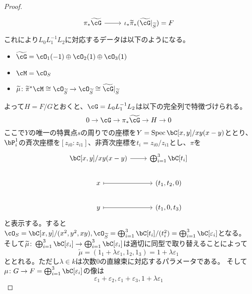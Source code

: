\documentclass[uplatex, a4paper, dvipdfmx]{jsarticle}
\theoremstyle{definition}
\DeclareMathOperator{\Spec}{\mathrm{Spec}}
\begin{document}
\begin{proof}
\begin{equation}
\begin{tikzcd}
            \pi_*\widetilde{\cG} \arrow[r] & \iota_*\widetilde{\pi}_*(\widetilde{\cG}\vert_{\widetilde{S}}) = F
        \end{tikzcd}
    \end{equation}
    これにより$L_0L_1^{-1}L_2$に対応するデータは以下のようになる。
    \begin{itemize}
        \item $\widetilde{\cG} = \cO_1(-1)\oplus\cO_2(1)\oplus\cO_3(1)$
        \item $\cM = \cO_S$
        \item $\widetilde{\mu} \colon \widetilde{\pi}^*\cM \cong \cO_{\widetilde{S}} \to \cO_{\widetilde{S}} \cong \widetilde{\cG}\vert_{\widetilde{S}}$
    \end{itemize}
    よって$H = F/G$とおくと、$\cG = L_0L_1^{-1}L_2$は以下の完全列で特徴づけられる。
    \begin{equation}
        0 \to \cG \to \pi_*\widetilde{\cG} \to H \to 0
    \end{equation}
    ここで$Y$の唯一の特異点$s$の周りでの座標を$Y = \Spec \bC[x, y]/xy(x-y)$ととり、$\bP^1_i$の斉次座標を$[z_{i0} : z_{i1}]$、非斉次座標を$t_i = z_{i0}/z_{i1}$とし、$\pi$を
    \begin{equation}
        \begin{tikzcd}
            \bC[x, y]/xy(x-y) \arrow[r]& \bigoplus_{i=1}^3 \bC[t_i] \\
            x \arrow[r, mapsto] & (t_1, t_2, 0) \\
            y \arrow[r, mapsto] & (t_1, 0, t_3)
        \end{tikzcd}
    \end{equation}
    と表示する。すると$\cO_S = \bC[x,y]/(x^2, y^2, xy), \cO_{\widetilde{S}} = \bigoplus_{i=1}^3 \bC[t_i]/(t_i^2) = \bigoplus_{i=1}^3 \bC[\varepsilon_i]$となる。
    そして$\widetilde{\mu} \colon \bigoplus_{i=1}^3 \bC[\varepsilon_i] \to \bigoplus_{i=1}^3 \bC[\varepsilon_i]$は適切に同型で取り替えることによって
    \begin{equation}
        \widetilde{\mu} = (1_1 + \lambda \varepsilon_1, 1_2, 1_3) = 1 + \lambda \varepsilon_1
    \end{equation}
    ととれる。ただし$\lambda \in k$は次数$0$の直線束に対応するパラメータである。
    そして$\mu \colon G \to F = \bigoplus_{i=1}^3 \bC[\varepsilon_i]$の像は
    \begin{equation}
        \varepsilon_1 + \varepsilon_2, \varepsilon_1 + \varepsilon_3, 1 + \lambda \varepsilon_1
    \end{equation}

\end{proof}
\end{document}
